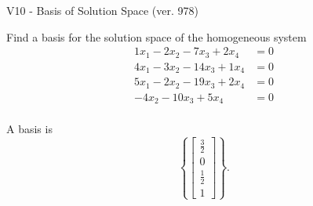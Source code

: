 \begin{exercise}
  \begin{exerciseTitle}V10 - Basis of Solution Space (ver. 978)\end{exerciseTitle}
  \begin{exerciseStatement}
    Find a basis for the solution space of the homogeneous system 
\begin{align*}
 1 x_ 1 -2 x_ 2 -7 x_ 3 + 2 x_ 4 &= 0  \\ 
  4 x_ 1 -3 x_ 2 -14 x_ 3 + 1 x_ 4 &= 0  \\ 
  5 x_ 1 -2 x_ 2 -19 x_ 3 + 2 x_ 4 &= 0  \\ 
  -4 x_ 2 -10 x_ 3 + 5 x_ 4 &= 0  \\ 
 \end{align*}


 
  \end{exerciseStatement}

  \begin{exerciseAnswer}
   A basis is   
\[\left\{\left[\begin{array}{c}
\frac{3}{2} \\
0 \\
\frac{1}{2} \\
1
\end{array}\right]\right\}.\]

  


  \end{exerciseAnswer}
\end{exercise}